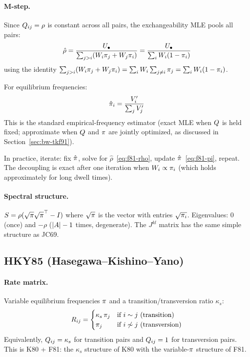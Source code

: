 \paragraph{M-step.}
Since $Q_{ij} = \rho$ is constant across all pairs,
the exchangeability MLE pools all pairs:
\begin{equation}
\label{eq:f81-rho}
\hat{\rho} = \frac{U_\bullet}{\sum_{j > i}(W_i \pi_j + W_j \pi_i)}
= \frac{U_\bullet}{\sum_i W_i (1 - \pi_i)}
\end{equation}
using the identity
$\sum_{j>i}(W_i \pi_j + W_j \pi_i) = \sum_i W_i \sum_{j \neq i} \pi_j = \sum_i W_i(1 - \pi_i)$.

For equilibrium frequencies:
\begin{equation}
\label{eq:f81-pi}
\hat{\pi}_i = \frac{V'_i}{\sum_j V'_j}
\end{equation}
This is the standard empirical-frequency estimator (exact MLE when
$Q$ is held fixed; approximate when $Q$ and $\pi$ are jointly
optimized, as discussed in Section~\ref{sec:bw-tkf91}).

In practice, iterate: fix $\hat{\pi}$, solve for $\hat\rho$~\eqref{eq:f81-rho},
update $\hat{\pi}$~\eqref{eq:f81-pi}, repeat.
The decoupling is exact after one iteration when $W_i \propto \pi_i$
(which holds approximately for long dwell times).

\paragraph{Spectral structure.}
$S = \rho(\sqrt{\pi}\sqrt{\pi}^\top - I)$
where $\sqrt{\pi}$ is the vector with entries $\sqrt{\pi_i}$.
Eigenvalues: $0$ (once) and $-\rho$ ($|A|-1$ times, degenerate).
The $J^{kl}$ matrix has the same simple structure as JC69.


\subsection{HKY85 (Hasegawa--Kishino--Yano)}
\label{sec:mstep-hky85}

\paragraph{Rate matrix.}
Variable equilibrium frequencies $\pi$ and a
transition/transversion ratio $\kappa_s$:
\[
R_{ij} = \begin{cases}
  \kappa_s\, \pi_j & \text{if } i \sim j \text{ (transition)} \\
  \pi_j & \text{if } i \not\sim j \text{ (transversion)}
\end{cases}
\]
Equivalently, $Q_{ij} = \kappa_s$ for transition pairs and
$Q_{ij} = 1$ for transversion pairs.
This is K80 + F81: the $\kappa_s$ structure of K80 with the
variable-$\pi$ structure of F81.

